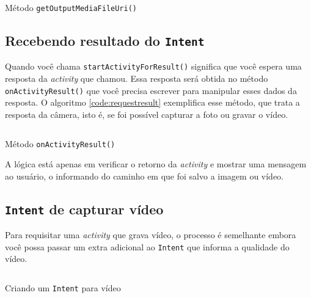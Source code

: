 \documentclass[a4paper,12pt,brazil]{book}
\begin{document}
\begin{singlespace}
		\begin{listing}[H]
		\inputminted[linenos=true,fontsize=\small,frame=lines, framesep=2mm, tabsize=2,numbersep=5pt]{java}{src/api/camera/urifromfile.java}
		\caption{Método \texttt{getOutputMediaFileUri()}}
		\label{code:urifromfile}
		\end{listing} 		

	\subsection{Recebendo resultado do \texttt{Intent}}
		
		Quando você chama \texttt{startActivityForResult()} significa que você espera uma resposta da \emph{activity} que chamou. Essa resposta será obtida no método \texttt{onActivityResult()} que você precisa escrever para manipular esses dados da resposta. O algoritmo \ref{code:requestresult} exemplifica esse método, que trata a resposta da câmera, isto é, se foi possível capturar a foto ou gravar o vídeo.

		\begin{listing}[H]
		\inputminted[linenos=true,fontsize=\small,frame=lines, framesep=2mm, tabsize=2,numbersep=5pt]{java}{src/api/camera/requestresult.java}
		\caption{Método \texttt{onActivityResult()}}
		\label{code:requestresult}
		\end{listing} 		

		A lógica está apenas em verificar o retorno da \emph{activity} e mostrar uma mensagem ao usuário, o informando do caminho em que foi salvo a imagem ou vídeo.  


	\subsection{\texttt{Intent} de capturar vídeo}

		Para requisitar uma \emph{activity} que grava vídeo, o processo é semelhante embora você possa passar um extra adicional ao \texttt{Intent} que informa a qualidade do vídeo.

		\begin{listing}[H]
		\inputminted[linenos=true,fontsize=\small,frame=lines, framesep=2mm, tabsize=2,numbersep=5pt]{java}{src/api/camera/recordintent.java}
		\caption{Criando um \texttt{Intent} para vídeo}
		\label{code:recordintent}
		\end{listing} 		
		

\end{singlespace}
\end{document}

